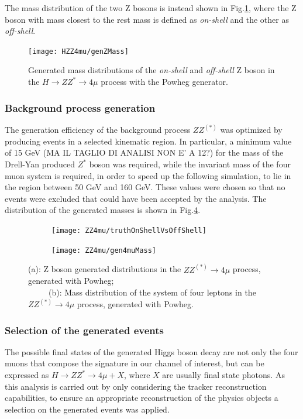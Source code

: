 \documentclass[a4paper,twoside,12pt]{article}
\begin{document}
The mass distribution of the two Z bosons is instead shown in Fig.\ref{fig:HZZ4mu:generatedZMass}, where the Z boson with mass closest to the rest mass
is defined as \textit{on-shell} and the other as \textit{off-shell}.

\begin{figure}
\centering
  \texttt{[image: HZZ4mu/genZMass]}
  \caption{Generated mass distributions of the \textit{on-shell} and \textit{off-shell} Z boson 
  in the $H \rightarrow ZZ^* \rightarrow 4\mu$ process with the Powheg generator.}
\label{fig:HZZ4mu:generatedZMass}
\end{figure}

\subsubsection{Background process generation}\label{physics:bkgGeneration}
The generation efficiency of the background process $ZZ^{(*)}$ was optimized by
producing events in a selected kinematic region. In particular, a minimum value of 15 GeV (MA IL TAGLIO DI ANALISI NON E' A 12?) for the mass of
the Drell-Yan produced $Z^*$ boson was required, while the invariant mass of the four muon system is required,
in order to speed up the following simulation, 
to lie in the region between 50 GeV and 160 GeV. These values were chosen so that no events were excluded that could
have been accepted by the analysis. The distribution of the generated masses is shown 
in Fig.\ref{fig:ZZ4mu:genMasses}.\\

\begin{figure}
\begin{subfigure}{.5\linewidth}
\texttt{[image: ZZ4mu/truthOnShellVsOffShell]}
\caption{}
\label{fig:ZZ4mu:truthOnShellVsOffShell}
\end{subfigure}
\begin{subfigure}{.5\linewidth}
\centering
\texttt{[image: ZZ4mu/gen4muMass]}
\caption{}
\label{fig:ZZ4mu:gen4muMass}
\end{subfigure}
\caption{(a): Z boson generated distributions in the $ZZ^{(*)} \rightarrow 4\mu$ process, generated with Powheg;\\
\ \ \ \ \ (b): Mass distribution of the system of four leptons in the $ZZ^{(*)} \rightarrow 4\mu$ process, generated with Powheg.}
\label{fig:ZZ4mu:genMasses}
\end{figure}


\subsubsection{Selection of the generated events}
The possible final states of the generated Higgs boson decay are not only the four muons that 
compose the signature in our channel of interest, but can be expressed as $H \rightarrow
ZZ^* \rightarrow 4\mu + X$, where $X$ are usually final state photons. As this analysis
is carried out by only considering the tracker reconstruction capabilities, to ensure 
an appropriate reconstruction of the physics objects a selection on the 
generated events was applied.\\
\end{document}
